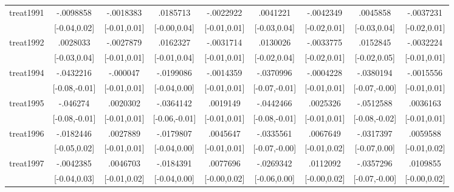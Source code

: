 \begin{table}[htbp]
\begin{tabular}{l*{8}{c}}
treat1991   &   -.0098858         &   -.0018383         &    .0185713         &   -.0022922         &    .0041221         &   -.0042349         &    .0045858         &   -.0037231         \\
            &[-0.04,0.02]         &[-0.01,0.01]         &[-0.00,0.04]         &[-0.01,0.01]         &[-0.03,0.04]         &[-0.02,0.01]         &[-0.03,0.04]         &[-0.02,0.01]         \\
treat1992   &    .0028033         &   -.0027879         &    .0162327         &   -.0031714         &    .0130026         &   -.0033775         &    .0152845         &   -.0032224         \\
            &[-0.03,0.04]         &[-0.01,0.01]         &[-0.01,0.04]         &[-0.01,0.01]         &[-0.02,0.04]         &[-0.02,0.01]         &[-0.02,0.05]         &[-0.01,0.01]         \\
treat1994   &   -.0432216\sym{*}  &    -.000047         &   -.0199086         &   -.0014359         &   -.0370996\sym{*}  &   -.0004228         &   -.0380194\sym{*}  &   -.0015556         \\
            &[-0.08,-0.01]         &[-0.01,0.01]         &[-0.04,0.00]         &[-0.01,0.01]         &[-0.07,-0.01]         &[-0.01,0.01]         &[-0.07,-0.00]         &[-0.01,0.01]         \\
treat1995   &    -.046274\sym{**} &    .0020302         &   -.0364142\sym{**} &    .0019149         &   -.0442466\sym{**} &    .0025326         &   -.0512588\sym{**} &    .0036163         \\
            &[-0.08,-0.01]         &[-0.01,0.01]         &[-0.06,-0.01]         &[-0.01,0.01]         &[-0.08,-0.01]         &[-0.01,0.01]         &[-0.08,-0.02]         &[-0.01,0.01]         \\
treat1996   &   -.0182446         &    .0027889         &   -.0179807         &    .0045647         &   -.0335561\sym{*}  &    .0067649         &   -.0317397         &    .0059588         \\
            &[-0.05,0.02]         &[-0.01,0.01]         &[-0.04,0.00]         &[-0.01,0.01]         &[-0.07,-0.00]         &[-0.01,0.02]         &[-0.07,0.00]         &[-0.01,0.02]         \\
treat1997   &   -.0042385         &    .0046703         &   -.0184391         &    .0077696         &   -.0269342         &    .0112092         &   -.0357296\sym{*}  &    .0109855         \\
            &[-0.04,0.03]         &[-0.01,0.02]         &[-0.04,0.00]         &[-0.00,0.02]         &[-0.06,0.00]         &[-0.00,0.02]         &[-0.07,-0.00]         &[-0.00,0.02]         \\

\end{tabular}
\end{table}
